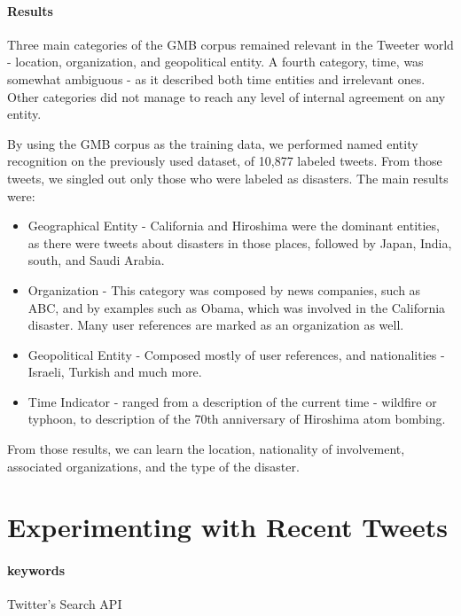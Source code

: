 \documentclass[letterpaper,twocolumn,10pt]{article}
\begin{document}
\paragraph{Results}

Three main categories of the GMB corpus remained relevant in the Tweeter world - location, organization, and geopolitical entity. A fourth category, time, was somewhat ambiguous - as it described both time entities and irrelevant ones. Other categories did not manage to reach any level of internal agreement on any entity.

By using the GMB corpus as the training data, we performed named entity recognition on the previously used dataset, of 10,877 labeled tweets. From those tweets, we singled out only those who were labeled as disasters. The main results were:

\begin{itemize}[noitemsep, nolistsep]
	\item Geographical Entity - California and Hiroshima were the dominant entities, as there were tweets about disasters in those places, followed by Japan, India, south, and Saudi Arabia.
	\item Organization - This category was composed by news companies, such as ABC, and by examples such as Obama, which was involved in the California disaster. Many user references are marked as an organization as well.
	\item Geopolitical Entity - Composed mostly of user references, and nationalities - Israeli, Turkish and much more.
	\item Time Indicator - ranged from a description of the current time - wildfire or typhoon, to description of the 70th anniversary of Hiroshima atom bombing.
\end{itemize}
From those results, we can learn the location, nationality of involvement, associated organizations, and  the type of the disaster.

\section{Experimenting with Recent Tweets}

\paragraph{keywords}Twitter's Search API

\end{document}
